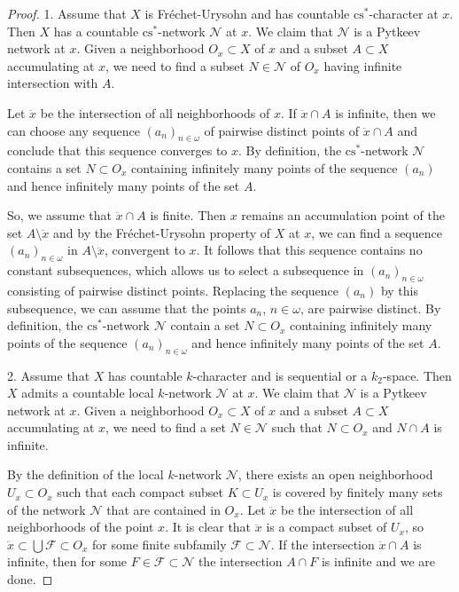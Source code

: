 \documentclass{amsart}
\theoremstyle{definition}
\begin{document}
\begin{proof} 1. Assume that $X$ is Fr\'echet-Urysohn and has countable ${\mathrm{cs}}^*$-character at $x$. Then $X$ has a countable ${\mathrm{cs}}^*$-network ${\mathcal N}$ at $x$. We claim that ${\mathcal N}$ is a Pytkeev network at $x$. Given a neighborhood $O_x\subset X$ of $x$ and a subset $A\subset X$ accumulating at $x$, we need to find
a subset $N\in\mathcal N$ of $O_x$ having infinite intersection with  $A$.

Let $\ddot x$ be the intersection of all neighborhoods of $x$. If $\ddot x\cap A$ is infinite, then we can choose any sequence $(a_n)_{n\in{\omega}}$ of pairwise distinct points of $\ddot x\cap A$ and conclude that this sequence converges to $x$. By definition, the ${\mathrm{cs}}^*$-network $\mathcal N$ contains a set $N\subset O_x$ containing infinitely many points of the sequence $(a_n)$ and hence infinitely many points of the set $A$.

So, we assume that $\ddot x\cap A$ is finite. Then $x$ remains an accumulation point of the set $A\setminus \ddot x$ and by the Fr\'echet-Urysohn property of $X$ at $x$, we can find a sequence $(a_n)_{n\in{\omega}}$ in $A\setminus \ddot x$, convergent to $x$. It follows that this sequence contains no constant subsequences, which allows us to select a subsequence in $(a_n)_{n\in{\omega}}$ consisting of pairwise distinct points. Replacing the sequence $(a_n)$ by this subsequence, we can assume that the points $a_n$, $n\in{\omega}$, are pairwise distinct. By definition, the ${\mathrm{cs}}^*$-network $\mathcal N$ contain a set $N\subset O_x$ containing infinitely many points of the sequence  $(a_n)_{n\in{\omega}}$ and hence infinitely many points of the set $A$.
\smallskip

2. Assume that $X$ has countable $k$-character and is sequential or a $k_2$-space. Then $X$ admits a countable local $k$-network $\mathcal N$ at $x$. We claim that $\mathcal N$ is a Pytkeev network at $x$. Given a neighborhood $O_x\subset X$ of $x$ and a subset $A\subset X$ accumulating at $x$, we need to find a set $N\in\mathcal N$ such that $N\subset O_x$ and $N\cap A$ is infinite.

By the definition of the local $k$-network $\mathcal N$, there exists an open neighborhood $U_x\subset O_x$ such that each compact subset $K\subset U_x$ is covered by finitely many sets of the network $\mathcal N$ that are contained in $O_x$. Let $\ddot x$ be the intersection of all neighborhoods of the point $x$. It is clear that $\ddot x$ is a compact subset of $U_x$, so $\ddot x\subset\bigcup{\mathcal F}\subset O_x$ for some finite subfamily ${\mathcal F}\subset \mathcal N$. If the intersection $\ddot x\cap A$ is infinite, then for some $F\in{\mathcal F}\subset\mathcal N$ the intersection $A\cap F$ is infinite and we are done.


\end{proof}
\end{document}
